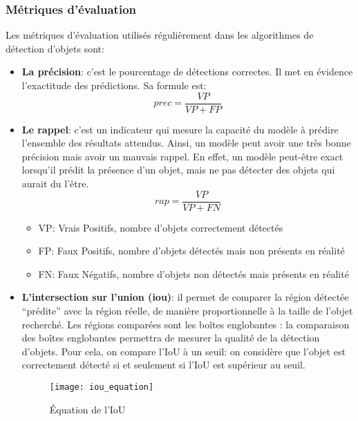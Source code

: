         \subsubsection{Métriques d'évaluation}
            Les métriques d’évaluation utilisés régulièrement dans les algorithmes de détection d’objets sont:
            \begin{itemize}
                \item \textbf{La précision}: c’est le pourcentage de détections correctes. Il met en évidence l'exactitude des prédictions. Sa formule est:
                \begin{equation}
                    prec = \frac{VP}{VP + FP}
                \end{equation}
            
                \item \textbf{Le rappel}: c’est un indicateur qui mesure la capacité du modèle à prédire l'ensemble des résultats attendus. Ainsi, un modèle peut avoir une très bonne précision mais avoir un mauvais rappel. En effet, un modèle peut-être exact lorsqu'il prédit la présence d'un objet, mais ne pas détecter des objets qui aurait du l'être.
                    \begin{equation}
                        rap = \frac{VP}{VP + FN}
                    \end{equation}
                    \begin{itemize}
                        \item VP: Vrais Positifs, nombre d'objets correctement détectés
                        \item FP: Faux Positifs, nombre d'objets détectés mais non présents en réalité
                        \item FN: Faux Négatifs, nombre d'objets non détectés mais présents en réalité
                    \end{itemize}
            
                \item \textbf{L’intersection sur l’union (\acrshort{iou})}: il permet de comparer la région détectée “prédite” avec la région réelle, de manière proportionnelle à la taille de l'objet recherché. Les régions comparées sont les boîtes englobantes : la comparaison des boîtes englobantes permettra de mesurer la qualité de la détection d'objets. Pour cela, on compare l’IoU à un seuil: on considère que l’objet est correctement détecté si et seulement si l’IoU est supérieur au seuil. 
                    \begin{figure}[H]
                        \centering
                        \texttt{[image: iou\_equation]}
                        \caption{Équation de l'IoU}
                    \end{figure}
            

\end{itemize}
